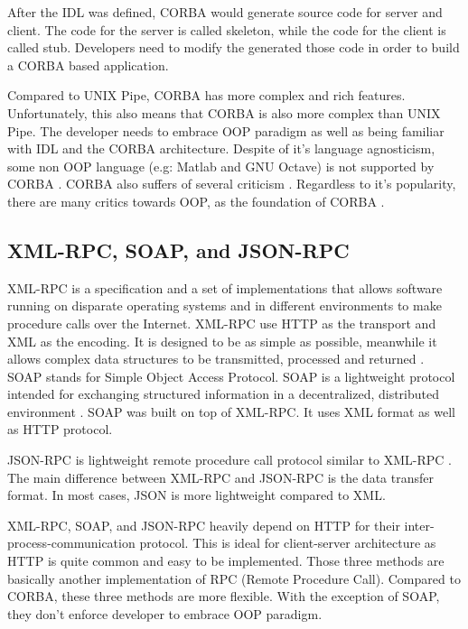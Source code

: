 \documentclass[conference]{IEEEtran}
\begin{document}
After the IDL was defined, CORBA would generate source code for server and client. The code for
the server is called skeleton, while the code for the client is called stub. Developers need to
modify the generated those code in order to build a CORBA based application.

Compared to UNIX Pipe, CORBA has more complex and rich features. Unfortunately, this also means 
that CORBA is also more complex than UNIX Pipe. The developer needs to embrace OOP 
paradigm as well as being familiar with IDL and the CORBA architecture. 
Despite of it's language agnosticism, some non OOP language (e.g: Matlab and GNU Octave) 
is not supported by CORBA \cite{feilhauer2016def}. CORBA also suffers of several 
criticism \cite{henning2006rise}. Regardless to it's popularity, there are many critics towards OOP, 
as the foundation of CORBA \cite{hadar2013intuition}.


\subsection{XML-RPC, SOAP, and JSON-RPC}

XML-RPC is a specification and a set of implementations that allows software running on 
disparate operating systems and in different environments to make procedure 
calls over the Internet. XML-RPC use HTTP as the transport and XML as the encoding.
It is designed to be as simple as possible, meanwhile it allows complex data structures to 
be transmitted, processed and returned \cite{xmlrpc}. SOAP stands for Simple Object Access Protocol. 
SOAP is a lightweight protocol intended for exchanging structured information in a decentralized, distributed 
environment \cite{soap}. SOAP was built on top of XML-RPC. It uses XML format as 
well as HTTP protocol.

JSON-RPC is lightweight remote procedure call protocol similar to XML-RPC 
\cite{jsonrpc}. The main difference between XML-RPC and JSON-RPC is the data transfer
format. In most cases, JSON is more lightweight compared to XML.

XML-RPC, SOAP, and JSON-RPC heavily depend on HTTP for their inter-process-communication 
protocol. This is ideal for client-server architecture as HTTP is quite common and
easy to be implemented. Those three methods are basically another implementation of RPC (Remote Procedure Call). 
Compared to CORBA, these three methods are more flexible. With the exception of SOAP,
they don't enforce developer to embrace OOP paradigm.
\end{document}
